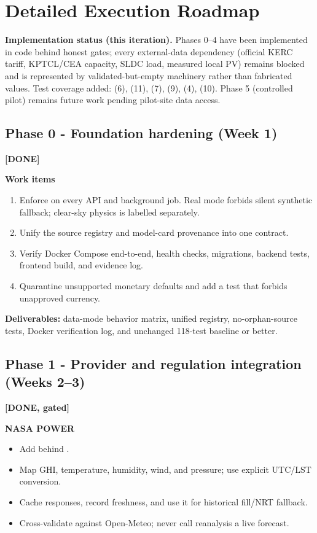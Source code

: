 \section{Detailed Execution Roadmap}

\textbf{Implementation status (this iteration).} Phases 0--4 have been implemented in
code behind honest gates; every external-data dependency (official KERC tariff,
KPTCL/CEA capacity, SLDC load, measured local PV) remains blocked and is represented
by validated-but-empty machinery rather than fabricated values. Test coverage added:
 (6),  (11),
 (7),  (9),
 (4), 
(10). Phase 5 (controlled pilot) remains future work pending pilot-site data access.

\subsection{Phase 0 - Foundation hardening (Week 1)} \textbf{[DONE]}

\textbf{Work items}
\begin{enumerate}
  \item Enforce  on every API and background job. Real mode forbids silent
        synthetic fallback; clear-sky physics is labelled separately.
  \item Unify the source registry and model-card provenance into one  contract.
  \item Verify Docker Compose end-to-end, health checks, migrations, backend tests, frontend build,
        and evidence log.
  \item Quarantine unsupported monetary defaults and add a test that forbids unapproved currency.
\end{enumerate}

\textbf{Deliverables:} data-mode behavior matrix, unified registry, no-orphan-source tests,
Docker verification log, and unchanged 118-test baseline or better.

\subsection{Phase 1 - Provider and regulation integration (Weeks 2--3)} \textbf{[DONE, gated]}

\textbf{NASA POWER}
\begin{itemize}
  \item Add  behind .
  \item Map GHI, temperature, humidity, wind, and pressure; use explicit UTC/LST conversion.
  \item Cache responses, record freshness, and use it for historical fill/NRT fallback.
  \item Cross-validate against Open-Meteo; never call reanalysis a live forecast.
\end{itemize}

